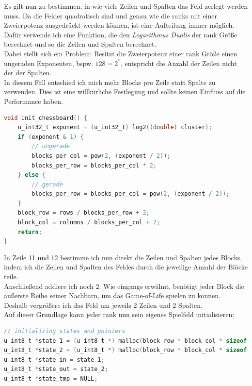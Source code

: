 \documentclass[german,plainarticle,hyperref,utf8]{zihpub}
\begin{document}
	Es gilt nun zu bestimmen, in wie viele Zeilen und Spalten das Feld zerlegt werden muss. Da die Felder quadratisch sind und genau wie die ranks mit einer Zweierpotenz ausgedrückt werden können, ist eine Aufteilung immer möglich.\\
	Dafür verwende ich eine Funktion, die den \textit{Logarithmus Dualis} der rank Größe berechnet und so die Zeilen und Spalten berechnet.\\
	Dabei stellt sich ein Problem: Besitzt die Zweierpotenz einer rank Größe einen ungeraden Exponenten, bspw. $128 = 2^7$, entspricht die Anzahl der Zeilen nicht der der Spalten.\\
	In diesem Fall entschied ich mich mehr Blocks pro Zeile statt Spalte zu verwenden. Dies ist eine willkürliche Festlegung und sollte keinen Einfluss auf die Performance haben.\\
	\begin{lstlisting}[language=C, caption=Bestimmung der Zeilen und Spalten des chessboard Layouts]
void init_chessboard() {
	u_int32_t exponent = (u_int32_t) log2((double) cluster);
	if (exponent & 1) {
		// ungerade
		blocks_per_col = pow(2, (exponent / 2));
		blocks_per_row = blocks_per_col * 2;
	} else {
		// gerade
		blocks_per_row = blocks_per_col = pow(2, (exponent / 2));
	}
	block_row = rows / blocks_per_row + 2;
	block_col = columns / blocks_per_col + 2;
	return;
}\end{lstlisting}

	In Zeile 11 und 12 bestimme ich nun direkt die Zeilen und Spalten jedes Blocks, indem ich die Zeilen und Spalten des Feldes durch die jeweilige Anzahl der Blöcke teile.\\
	Anschließend addiere ich noch 2. Wie eingangs erwähnt, benötigt jeder Block die äußerste Reihe seiner Nachbarn, um das Game-of-Life spielen zu können.\\
	Deshalb vergrößere ich das Feld um jeweils 2 Zeilen und 2 Spalten.\\
	
	Auf dieser Grundlage kann jeder rank nun sein eigenes Spielfeld initialisieren:
	\begin{lstlisting}[language=C, caption=Initialisierung der Spielfelder]
// initializing states and pointers
u_int8_t *state_1 = (u_int8_t *) malloc(block_row * block_col * sizeof(u_int8_t));
u_int8_t *state_2 = (u_int8_t *) malloc(block_row * block_col * sizeof(u_int8_t));
u_int8_t *state_in = state_1;
u_int8_t *state_out = state_2;
u_int8_t *state_tmp = NULL;
	\end{lstlisting}
	
\end{document}
